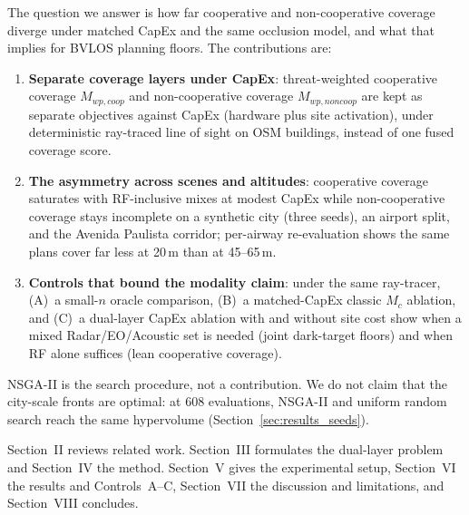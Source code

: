The question we answer is how far cooperative and non-cooperative coverage diverge under matched CapEx and the same occlusion model, and what that implies for BVLOS planning floors. The contributions are:

\begin{enumerate}
    \item \textbf{Separate coverage layers under CapEx}: threat-weighted cooperative coverage \(M_{wp,coop}\) and non-cooperative coverage \(M_{wp,noncoop}\) are kept as separate objectives against CapEx (hardware plus site activation), under deterministic ray-traced line of sight on OSM buildings, instead of one fused coverage score.
    \item \textbf{The asymmetry across scenes and altitudes}: cooperative coverage saturates with RF-inclusive mixes at modest CapEx while non-cooperative coverage stays incomplete on a synthetic city (three seeds), an airport split, and the Avenida Paulista corridor; per-airway re-evaluation shows the same plans cover far less at 20\,m than at 45--65\,m.
    \item \textbf{Controls that bound the modality claim}: under the same ray-tracer, (A)~a small-$n$ oracle comparison, (B)~a matched-CapEx classic \(M_c\) ablation, and (C)~a dual-layer CapEx ablation with and without site cost show when a mixed Radar/EO/Acoustic set is needed (joint dark-target floors) and when RF alone suffices (lean cooperative coverage).
\end{enumerate}

NSGA-II is the search procedure, not a contribution. We do not claim that the city-scale fronts are optimal: at 608 evaluations, NSGA-II and uniform random search reach the same hypervolume (Section~\ref{sec:results_seeds}).

Section~II reviews related work. Section~III formulates the dual-layer problem and Section~IV the method. Section~V gives the experimental setup, Section~VI the results and Controls~A--C, Section~VII the discussion and limitations, and Section~VIII concludes.

